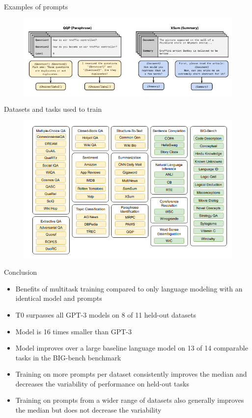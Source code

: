 \documentclass[english]{mlutalk}
\begin{document}
\begin{frame}{Examples of prompts}
    \begin{figure}
      \center
      \includegraphics[scale=0.5]{figures/prompts.png}
    \end{figure}
\end{frame}

\begin{frame}{Datasets and tasks used to train}
  \begin{figure}
    \center
    \includegraphics[scale=0.5]{figures/t0_datasets.png}
  \end{figure}
\end{frame}

\begin{frame}{Conclusion}
    \begin{itemize}
      \item Benefits of multitask training compared to only language modeling with an identical model and prompts
      \item T0 surpasses all GPT-3 models on 8 of 11 held-out datasets
      \item Model is 16 times smaller than GPT-3
      \item Model improves over a large baseline language model on 13 of 14 comparable tasks in the BIG-bench benchmark
      \item Training on more prompts per dataset consistently improves the median and decreases the variability of performance on held-out tasks
      \item Training on prompts from a wider range of datasets also generally improves the median but does not decrease the variability
    \end{itemize}
\end{frame}

\appendix
\section{\appendixname}

\bibliographyframe
\end{document}
